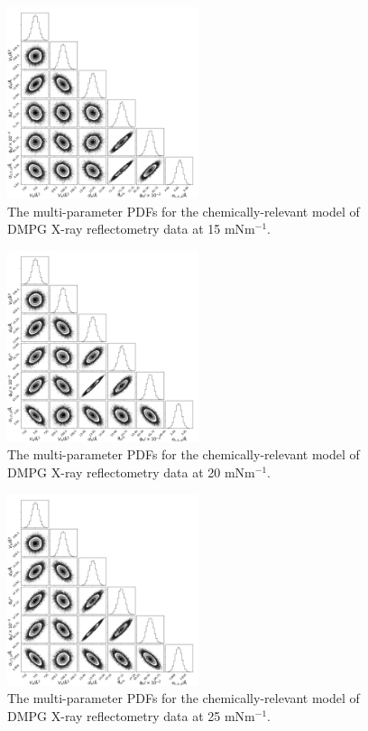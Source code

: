 \documentclass[11pt,a4paper]{paper}
\begin{document}
\begin{figure}[H]
	\centering
	\includegraphics[width=0.50\textwidth]{figures/dmpg1_all_corner}
	\caption{The multi-parameter PDFs for the chemically-relevant model of DMPG X-ray reflectometry data at 15 mNm$^{-1}$.}
	\label{fig:dmpg2}
\end{figure}
\begin{figure}[H]
	\centering
	\includegraphics[width=0.50\textwidth]{figures/dmpg2_all_corner}
	\caption{The multi-parameter PDFs for the chemically-relevant model of DMPG X-ray reflectometry data at 20 mNm$^{-1}$. }
	\label{fig:dmpg3}
\end{figure}
\begin{figure}[H]
	\centering
	\includegraphics[width=0.50\textwidth]{figures/dmpg3_all_corner}
	\caption{The multi-parameter PDFs for the chemically-relevant model of DMPG X-ray reflectometry data at 25 mNm$^{-1}$.}
	\label{fig:dmpg4}
\end{figure}
\end{document}
